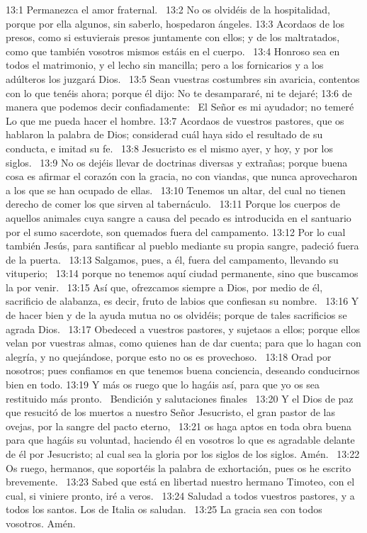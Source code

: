 13:1 Permanezca el amor fraternal.  
13:2 No os olvidéis de la hospitalidad, porque por ella algunos, sin saberlo, hospedaron ángeles. 
13:3 Acordaos de los presos, como si estuvierais presos juntamente con ellos; y de los maltratados, como que también vosotros mismos estáis en el cuerpo.  
13:4 Honroso sea en todos el matrimonio, y el lecho sin mancilla; pero a los fornicarios y a los adúlteros los juzgará Dios.  
13:5 Sean vuestras costumbres sin avaricia, contentos con lo que tenéis ahora; porque él dijo: No te desampararé, ni te dejaré; 
13:6 de manera que podemos decir confiadamente:  
El Señor es mi ayudador; no temeré  
Lo que me pueda hacer el hombre. 
13:7 Acordaos de vuestros pastores, que os hablaron la palabra de Dios; considerad cuál haya sido el resultado de su conducta, e imitad su fe.  
13:8 Jesucristo es el mismo ayer, y hoy, y por los siglos.  
13:9 No os dejéis llevar de doctrinas diversas y extrañas; porque buena cosa es afirmar el corazón con la gracia, no con viandas, que nunca aprovecharon a los que se han ocupado de ellas.  
13:10 Tenemos un altar, del cual no tienen derecho de comer los que sirven al tabernáculo.  
13:11 Porque los cuerpos de aquellos animales cuya sangre a causa del pecado es introducida en el santuario por el sumo sacerdote, son quemados fuera del campamento. 
13:12 Por lo cual también Jesús, para santificar al pueblo mediante su propia sangre, padeció fuera de la puerta.  
13:13 Salgamos, pues, a él, fuera del campamento, llevando su vituperio;  
13:14 porque no tenemos aquí ciudad permanente, sino que buscamos la por venir.  
13:15 Así que, ofrezcamos siempre a Dios, por medio de él, sacrificio de alabanza, es decir, fruto de labios que confiesan su nombre.  
13:16 Y de hacer bien y de la ayuda mutua no os olvidéis; porque de tales sacrificios se agrada Dios.  
13:17 Obedeced a vuestros pastores, y sujetaos a ellos; porque ellos velan por vuestras almas, como quienes han de dar cuenta; para que lo hagan con alegría, y no quejándose, porque esto no os es provechoso.  
13:18 Orad por nosotros; pues confiamos en que tenemos buena conciencia, deseando conducirnos bien en todo. 
13:19 Y más os ruego que lo hagáis así, para que yo os sea restituido más pronto.  
Bendición y salutaciones finales  
13:20 Y el Dios de paz que resucitó de los muertos a nuestro Señor Jesucristo, el gran pastor de las ovejas, por la sangre del pacto eterno,  
13:21 os haga aptos en toda obra buena para que hagáis su voluntad, haciendo él en vosotros lo que es agradable delante de él por Jesucristo; al cual sea la gloria por los siglos de los siglos. Amén.  
13:22 Os ruego, hermanos, que soportéis la palabra de exhortación, pues os he escrito brevemente.  
13:23 Sabed que está en libertad nuestro hermano Timoteo, con el cual, si viniere pronto, iré a veros.  
13:24 Saludad a todos vuestros pastores, y a todos los santos. Los de Italia os saludan.  
13:25 La gracia sea con todos vosotros. Amén. 